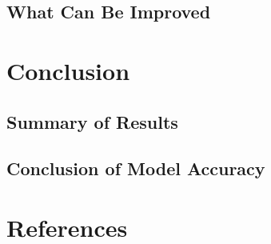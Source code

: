 \documentclass{article}
\begin{document}
\subsection{What Can Be Improved}

\section{Conclusion}
\subsection{Summary of Results}
\subsection{Conclusion of Model Accuracy}

\section{References}
\end{document}
